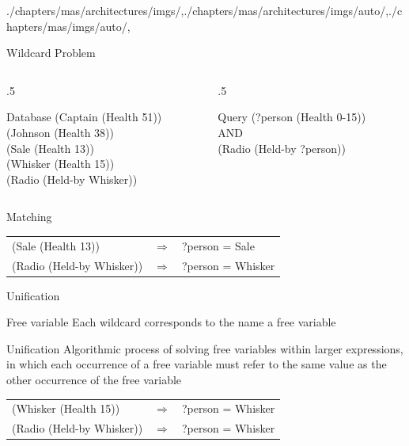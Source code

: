 \begin{graphicspathcontext}{{./chapters/mas/architectures/imgs/},{./chapters/mas/architectures/imgs/auto/},{./chapters/mas/imgs/auto/},\old}
\begin{frame}{Wildcard Problem}
	\begin{columns}[t]
		\begin{column}{.5\linewidth}
			\begin{block}{Database}\ttfamily
				(Captain (Health 51)) \\
				(Johnson (Health 38)) \\
				(Sale (Health 13)) \\
				(Whisker (Health 15)) \\
				(Radio (Held-by Whisker))
			\end{block}
		\end{column}
		\begin{column}{.5\linewidth}
			\begin{block}{Query}\ttfamily
				(?person (Health 0-15)) \\
				AND \\
				(Radio (Held-by ?person))
			\end{block}
		\end{column}
	\end{columns}
	\begin{block}{Matching}
		\begin{tabularx}{\linewidth}{>{\ttfamily}Xc>{\ttfamily}l}
			(Sale (Health 13)) & $\Rightarrow$ & ?person = Sale \\
			(Radio (Held-by Whisker)) & $\Rightarrow$ & ?person = Whisker \\
		\end{tabularx}
	\end{block}

\end{frame}

\begin{frame}{Unification}
	\vspace{.25cm}
	\begin{definitionblock}{Free variable}
		Each wildcard corresponds to the name a free variable
	\end{definitionblock}
	\begin{definitionblock}{Unification}
		Algorithmic process of solving free variables within larger expressions, in which each occurrence of a free variable must refer to the same value as the other occurrence of the free variable
	\end{definitionblock}
	\begin{example}
		\begin{tabularx}{\linewidth}{>{\ttfamily}Xc>{\ttfamily}l}
			(Whisker (Health 15)) & $\Rightarrow$ & ?person = Whisker \\
			(Radio (Held-by Whisker)) & $\Rightarrow$ & ?person = Whisker \\
		\end{tabularx}
	\end{example}
\end{frame}


\end{graphicspathcontext}
